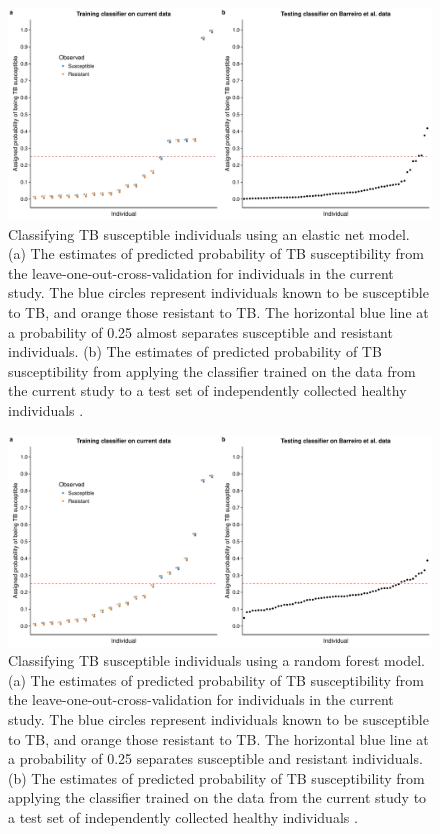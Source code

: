 \documentclass[fleqn,10pt]{wlscirep}
\begin{document}
\begin{figure}[ht]
\centering
\includegraphics[width=\linewidth]{../figure/classifier-en.pdf}
\caption{
Classifying TB susceptible individuals using an elastic net model. (a)
The estimates of predicted probability of TB susceptibility from the
leave-one-out-cross-validation for individuals in the current study.
The blue circles represent individuals known to be susceptible to TB,
and orange those resistant to TB. The horizontal blue line at a
probability of 0.25 almost separates susceptible and resistant
individuals. (b) The estimates of predicted probability of TB
susceptibility from applying the classifier trained on the data from
the current study to a test set of independently collected healthy
individuals \cite{Barreiro2012}.
}
\label{fig:class-en}
\end{figure}

\begin{figure}[ht]
\centering
\includegraphics[width=\linewidth]{../figure/classifier-rf.pdf}
\caption{
Classifying TB susceptible individuals using a random forest model.
(a) The estimates of predicted probability of TB susceptibility from
the leave-one-out-cross-validation for individuals in the current
study. The blue circles represent individuals known to be susceptible
to TB, and orange those resistant to TB. The horizontal blue line at a
probability of 0.25 separates susceptible and resistant individuals.
(b) The estimates of predicted probability of TB susceptibility from
applying the classifier trained on the data from the current study to
a test set of independently collected healthy individuals
\cite{Barreiro2012}.
}
\label{fig:class-rf}
\end{figure}
\end{document}
